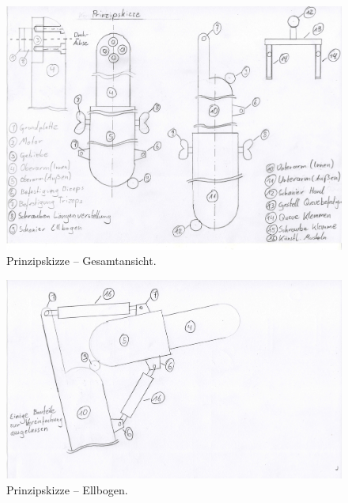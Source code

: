 			\begin{figure}[h]
				\centering
				\includegraphics[width=\textwidth]{Abb/Prinzipskizze_Gesamtansicht}
				\caption[Prinzipskizze -- Gesamtansicht]{Prinzipskizze -- Gesamtansicht.}\label{fig:prinzipskizze-gesamtansicht}
			\end{figure}

			\begin{figure}[h]
				\centering
				\includegraphics[width=\textwidth]{Abb/Prinzipskizze_Ellbogen}
				\caption[Prinzipskizze -- Ellbogen]{Prinzipskizze -- Ellbogen.}\label{fig:prinzipskizze-ellbogen}
			\end{figure}

